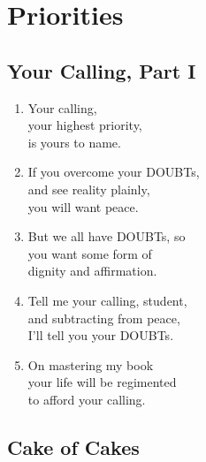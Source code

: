 \documentclass[
]{book}
\begin{document}
\hypertarget{priorities}{%
\chapter{Priorities}\label{priorities}}

\hypertarget{your-calling-part-i}{%
\section{Your Calling, Part I}\label{your-calling-part-i}}

\begin{enumerate}
\def\labelenumi{\arabic{enumi}.}
\item
  Your calling,\\
  your highest priority,\\
  is yours to name.
\item
  If you overcome your DOUBTs,\\
  and see reality plainly,\\
  you will want peace.
\item
  But we all have DOUBTs, so\\
  you want some form of\\
  dignity and affirmation.
\item
  Tell me your calling, student,\\
  and subtracting from peace,\\
  I'll tell you your DOUBTs.
\item
  On mastering my book\\
  your life will be regimented\\
  to afford your calling.
\end{enumerate}

\hypertarget{cake-of-cakes}{%
\section{Cake of Cakes}\label{cake-of-cakes}}
\end{document}
